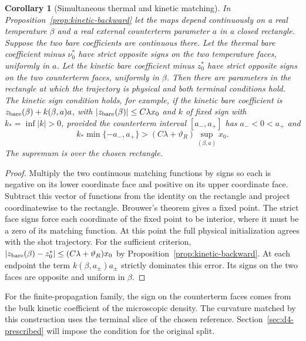 \documentclass[11pt]{article}
\newtheorem{corollary}[theorem]{Corollary}
\theoremstyle{definition}
\begin{document}
\begin{corollary}[Simultaneous thermal and kinetic matching]
\label{cor:kinetic-two-matching}
In Proposition~\ref{prop:kinetic-backward} let the maps depend
continuously on a real temperature \(\beta\) and a real
external counterterm parameter \(a\) in a closed rectangle.
Suppose the two bare coefficients are continuous there.
Let the thermal bare coefficient minus \(\nu_0^*\) have
strict opposite signs on the two temperature faces, uniformly
in \(a\). Let the kinetic bare coefficient minus \(z_0^*\)
have strict opposite signs on the two counterterm faces,
uniformly in \(\beta\). Then there are parameters in the
rectangle at which the trajectory is physical and both
terminal conditions hold. The kinetic sign condition holds,
for example, if the kinetic bare coefficient is
\(z_{\rm bare}(\beta)+k(\beta,a)a\), with
\(|z_{\rm bare}(\beta)|\le C\lambda x_0\) and \(k\) of fixed
sign with \(k_*=\inf |k|>0\), provided the counterterm interval
\([a_-,a_+]\) has \(a_-<0<a_+\) and
\begin{equation}
 k_*\min\{-a_-,a_+\}>
             (C\lambda+\vartheta_R)\sup_{(\beta,a)}x_0 .
\end{equation}
The supremum is over the chosen rectangle.
\end{corollary}
\begin{proof}
Multiply the two continuous matching functions by signs so
each is negative on its lower coordinate face and positive
on its upper coordinate face. Subtract this vector of
functions from the identity on the rectangle and project
coordinatewise to the rectangle. Brouwer's theorem gives a
fixed point. The strict face signs force each coordinate
of the fixed point to be interior, where it must be a zero
of its matching function. At this point the full physical
initialization agrees with the shot trajectory. For the sufficient
criterion, \(|z_{\rm bare}(\beta)-z_0^*|\le(C\lambda+\vartheta_R)x_0\)
by Proposition~\ref{prop:kinetic-backward}. At each endpoint the
term \(k(\beta,a_\pm)a_\pm\) strictly dominates this error. Its
signs on the two faces are opposite and uniform in \(\beta\).
\end{proof}

For the finite-propagation family, the sign on the counterterm
faces comes from the bulk kinetic coefficient of the microscopic
density. The curvature matched by this construction uses the
terminal slice of the chosen reference. Section~\ref{sec:d4-prescribed}
will impose the condition for the original split.
\end{document}
